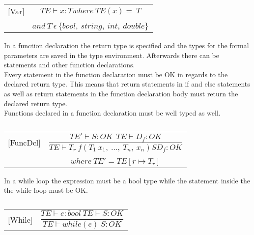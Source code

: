 \begin{table}[H]
    \begin{center}
    \begin{longtable}[c] { r c }
        [Var] 
        & 
        \( {T E  \vdash x  :  T} {where \ T E(x)=\ T} \)
         \\ \\
        & 
        \( {and \ T \ \epsilon \ \{bool,\ string,\ int,\ double\}} \)
    \end{longtable}
    \caption{}\label{s-empty}
        \end{center}
\end{table}
In a function declaration the return type is specified and the types for the formal parameters are saved in the type environment. Afterwards there can be statements and other function declarations. \\
Every statement in the function declaration must be OK in regards to the declared return type. This means that return statements in if and else statements as well as return statements in the function declaration body must return the declared return type. \\ 
Functions declared in a function declaration must be well typed as well.
\begin{table}[H]
    \begin{center}
    \begin{longtable}[c] { r c }
        [FuncDcl] 
        & 
        \( \dfrac{TE' \vdash S : OK \ \ TE \vdash D_{f}: OK} 
        {T E \vdash T_r \ f(T_1 \ x_1,\ ...,\ T_n,\ x_n)S D_f : OK} \) 
        \\ \\
        & 
        \( {where \ TE' = TE[r \mapsto T_r]} \)
    \end{longtable}
    \caption{}\label{s-empty}
        \end{center}
\end{table}

In a while loop the expression must be a bool type while the statement inside the the while loop must be OK.
\begin{table}[H]
    \begin{center}
    \begin{longtable}[c] { r c }
        [While] 
        & 
        \( \dfrac{T E  \vdash e  :  bool \ T E \vdash S : OK}{T E \vdash while(e) \ S : OK} \)

    \end{longtable}
    \caption{}\label{s-empty}
        \end{center}
\end{table}

